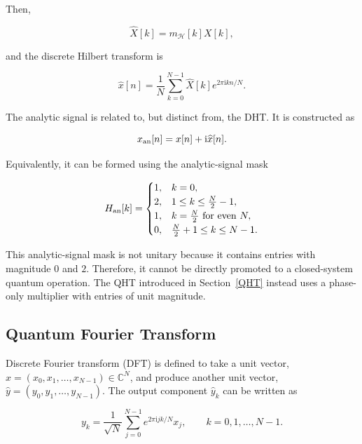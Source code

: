 \documentclass[11pt]{article}
\theoremstyle{plain}
\theoremstyle{definition}
\theoremstyle{remark}
\begin{document}
Then,

\begin{equation}
\widehat{X}[k]
=
m_{\mathcal{H}}[k]X[k],
\end{equation}

and the discrete Hilbert transform is

\begin{equation}
\widehat{x}[n]
=
\frac{1}{N}
\sum_{k=0}^{N-1}
\widehat{X}[k]e^{2\pi \mathrm{i}kn/N}.
\end{equation}

The analytic signal is related to, but distinct from, the DHT. It is constructed as

\begin{equation}
x_{\rm an}[n]
=
x[n]+\mathrm{i}\widehat{x}[n].
\end{equation}

Equivalently, it can be formed using the analytic-signal mask

\begin{equation}
H_{\rm an}[k] =
\begin{cases}
1, & k=0,\\
2, & 1\leq k\leq \frac{N}{2}-1,\\
1, & k=\frac{N}{2} \text{ for even } N,\\
0, & \frac{N}{2}+1\leq k\leq N-1.
\end{cases}
\end{equation}

This analytic-signal mask is not unitary because it contains entries with magnitude $0$ and $2$. Therefore, it cannot be directly promoted to a closed-system quantum operation. The QHT introduced in Section~\ref{QHT} instead uses a phase-only multiplier with entries of unit magnitude.

\subsection{Quantum Fourier Transform}

Discrete Fourier transform (DFT) is defined to take a unit vector,
$\hat{x}=(x_0,x_1,\ldots,x_{N-1})\in\mathbb{C}^N$, and produce another unit vector,
$\hat{y}=(y_0,y_1,\ldots,y_{N-1})$. The output component $\hat{y}_k$ can be written as \citep{zhouquant2017}

\begin{equation}
y_k
=
\frac{1}{\sqrt{N}}
\sum_{j=0}^{N-1}
e^{2\pi \mathrm{i}jk/N}x_j,
\qquad
k=0,1,\ldots,N-1.
\label{dft}
\end{equation}
\end{document}
